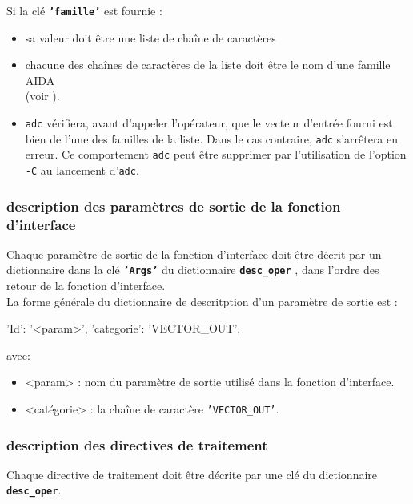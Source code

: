   Si la clé \textbf{\texttt{'famille'}} est fournie :
  \begin{itemize}
    \item[•] sa valeur doit être une liste de chaîne de caractères
    \item[•] chacune des chaînes de caractères de la liste  doit être le nom
             d'une famille AIDA  \\
             (voir ).
    \item[•] \texttt{adc} vérifiera, avant d'appeler l'opérateur, que le
             vecteur d'entrée fourni est bien de l'une des familles de la liste.
             Dans le cas contraire, \texttt{adc} s'arrêtera en erreur. Ce
             comportement \texttt{adc} peut être supprimer par l'utilisation de
             l'option \texttt{-C} au lancement d'\texttt{adc}. \\
  \end{itemize}

\subsubsection{description des paramètres de sortie de la fonction d'interface}
\label{sec:param_out}
Chaque paramètre de sortie de la fonction d'interface doit être décrit par
un dictionnaire dans la clé \textbf{\texttt{'Args'}} du dictionnaire
\textbf{\texttt{desc\_oper}} , dans l'ordre des retour de la fonction
d'interface. \\

La forme générale du dictionnaire de descritption d'un paramètre de sortie est :
  \medbreak

  \begin{boxedverbatim}
    {'Id': '<param>', 'categorie': 'VECTOR_OUT'},
  \end{boxedverbatim}
  \medbreak

  avec:
  \begin{itemize}
    \item[•] <param> : nom du paramètre de sortie utilisé dans la fonction
             d'interface.
    \item[•] <catégorie> : la chaîne de caractère \texttt{'VECTOR\_OUT'}.
  \end{itemize}
  \medbreak

\subsubsection{description des directives de traitement}
\label{sec:directives}
Chaque directive de traitement doit être décrite par une clé du dictionnaire
\textbf{\texttt{desc\_oper}}.

